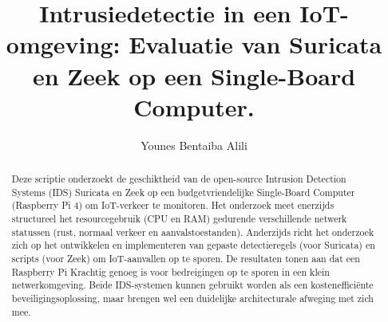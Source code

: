 \documentclass[a0,portrait]{hogent-poster}
\title{Intrusiedetectie in een IoT-omgeving: Evaluatie van Suricata en Zeek op een Single-Board Computer.}
\subtitle{}
\author{Younes Bentaiba Alili}
\begin{document}
\maketitle

\begin{abstract}
Deze scriptie onderzoekt de geschiktheid van de open-source Intrusion Detection Systems (IDS) Suricata en Zeek op een budgetvriendelijke Single-Board Computer (Raspberry Pi 4) om IoT-verkeer te monitoren. Het onderzoek meet enerzijds structureel het resourcegebruik (CPU en RAM) gedurende verschillende netwerk statussen (rust, normaal verkeer en aanvalstoestanden). Anderzijds richt het onderzoek zich op het ontwikkelen en implementeren van gepaste detectieregels (voor Suricata) en scripts (voor Zeek) om IoT-aanvallen op te sporen.
De resultaten tonen aan dat een Raspberry Pi Krachtig genoeg is voor bedreigingen op te sporen in een klein netwerkomgeving. Beide IDS-systemen kunnen gebruikt worden als een kostenefficiënte beveiligingsoplossing, maar brengen wel een duidelijke architecturale afweging met zich mee. 

\end{abstract}
\end{document}
